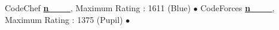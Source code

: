 

\begin{cvhonors}
  \cvhonor
    {\small CodeChef}
    {\small\qquad\quad
     \textbf{\href{https://www.codechef.com/users/n___}{n\_\_\_}}, Maximum Rating : 1611 (Blue)}
    {}
    {$\bullet$}
  \cvhonor
    {\small CodeForces}
    {\small\qquad
     \textbf{ \href{http://www.codeforces.com/profile/n___}{n\_\_\_}}, Maximum Rating : 1375 (Pupil)}
    {}
    {$\bullet$}
\end{cvhonors}
